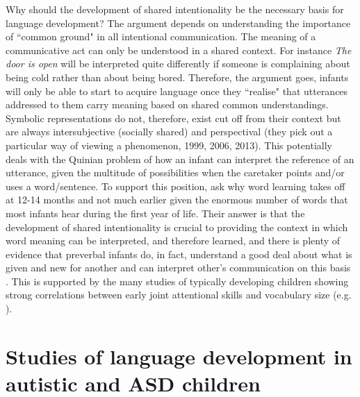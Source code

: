 \documentclass[output=paper]{langsci/langscibook}
\begin{document}
  Why should the development of shared intentionality be the necessary basis for language development?  The argument depends on understanding the importance of ``common ground" in all intentional communication.  The meaning of a communicative act can only be understood in a shared context. For instance \textit{The door is open} will be interpreted quite differently if someone is complaining about being cold rather than about being bored.   Therefore, the argument goes, infants will only be able to start to acquire language once they ``realise" that utterances addressed to them carry meaning based on shared common understandings.  Symbolic representations do not, therefore, exist cut off from their context but are always intersubjective (socially shared) and perspectival (they pick out a particular way of viewing a  phenomenon,  \citeauthor{Tomasello1999} 1999, \citeauthor{Levinson2006} 2006, \citeauthor{Enfield2013} 2013).  This potentially deals with the Quinian problem of how an infant can interpret the reference of an utterance, given the multitude of possibilities when the caretaker points and/or uses a word/sentence. To support this position, \citeauthor{Carpenter2000} ask why word learning takes off at 12-14 months and not much earlier given the enormous number of words that most infants hear during the first year of life.  Their answer is that the development of shared intentionality is crucial to providing the context in which word meaning can be interpreted, and therefore learned, and there is plenty of evidence that preverbal infants do, in fact, understand a good deal about what is given and new for another and can interpret other’s communication on this basis \citep{Tomasello2003attention,Moll2008}. This is supported by the many studies of typically developing children showing strong correlations between early joint attentional skills and vocabulary size (e.g. \citeauthor{Carpenter1998} \citeyear{Carpenter1998}). 

\section{Studies of language development in autistic and ASD children}
\end{document}
